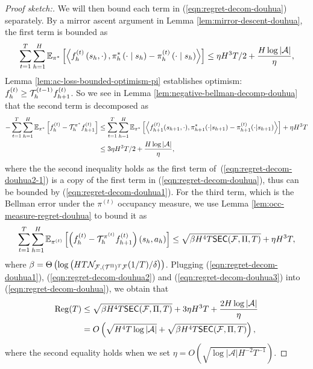 \begin{proof}[Proof sketch:]
We will then bound each term in (\ref{eqn:regret-decom-douhua}) separately. By a mirror ascent argument in Lemma \ref{lem:mirror-descent-douhua}, the first term is bounded as
\begin{align}\label{eqn:regret-decom-douhua1}
    \sum_{t=1}^{T} \sum_{h=1}^H \mathbb{E}_{\pi^*}\left[\left\langle f_h^{(t)}\left(s_h, \cdot\right), \pi_h^*\left(\cdot \mid s_h\right)-\pi_h^{(t)}\left(\cdot \mid s_h\right)\right\rangle\right] \leq \eta H^3 T/2 + \frac{H \log |{\mathcal{A}}|}{\eta},
\end{align}
Lemma \ref{lem:ac-loss-bounded-optimism-pi} establishes optimism: $f_h^{(t)} \geq {\mathcal{T}}_h^{(t-1)} f_{h+1}^{(t)}$. So we see in Lemma \ref{lem:negative-bellman-decomp-douhua} that the second term is decomposed as
\begin{align}\label{eqn:regret-decom-douhua2-1}
    -\sum_{t=1}^T \sum_{h=1}^H \mathbb{E}_{\pi^*}\left[f_h^{(t)}-\mathcal{T}_h^{\pi^{*}} f_{h+1}^{(t)}\right] & \leq  \sum_{t=1}^T \sum_{h=1}^H \mathbb{E}_{\pi^{*}}\left[\left\langle f_{h+1}^{(t)}(s_{h+1},\cdot), \pi_{h+1}^{*} (\cdot | s_{h+1}) -\pi_{h+1}^{(t)}(\cdot | s_{h+1}) \right\rangle\right] + \eta H^3T\\
    \label{eqn:regret-decom-douhua2}
    & \leq 3\eta H^3T/2 + \frac{H \log |{\mathcal{A}}|}{\eta},
\end{align}
where the the second inequality holds as the first term of~(\ref{eqn:regret-decom-douhua2-1}) is a copy of the first term in (\ref{eqn:regret-decom-douhua}), thus can be bounded by (\ref{eqn:regret-decom-douhua1}).
For the third term, which is the Bellman error under the $\pi^{(t)}$ occupancy measure, we use Lemma \ref{lem:occ-measure-regret-douhua} to bound it as
\begin{align}\label{eqn:regret-decom-douhua3}
    \sum_{t=1}^T \sum_{h=1}^H\mathbb{E}_{\pi^{(t)}}\left[\left(f_h^{(t)}-{\mathcal{T}}^{\pi^{(t)}}_h f_{h+1}^{(t)}\right)\left(s_h, a_h\right)\right]\leq \sqrt{\beta H^4 T \mathsf{SEC}({\mathcal{F}}, \Pi, T)} + \eta H^3 T,
\end{align}
where $\beta = \Theta\left(\log\left(HT\mathcal{N}_{{\mathcal{F}}, ({\mathcal{T}}^{\Pi})^T {\mathcal{F}}}(1/T)/\delta\right)\right)$. Plugging (\ref{eqn:regret-decom-douhua1}), (\ref{eqn:regret-decom-douhua2}) and (\ref{eqn:regret-decom-douhua3}) into (\ref{eqn:regret-decom-douhua}), we obtain that
\begin{align}
    \operatorname{Reg}(T) &\leq  \sqrt{\beta H^4 T \mathsf{SEC}({\mathcal{F}}, \Pi, T)} + 3\eta H^3 T + \frac{2H \log |{\mathcal{A}}|}{\eta} \nonumber\\
    &= O\left(\sqrt{H^4 T \log|{\mathcal{A}}|} + \sqrt{\beta H^4 T\mathsf{SEC}({\mathcal{F}}, \Pi, T)}\right),
\end{align}
where the second equality holds when we set $\eta = O(\sqrt{\log|\mathcal{A}|H^{-2}T^{-1}})$.
\end{proof}

